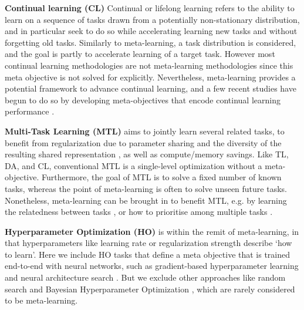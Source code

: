 \documentclass[10pt,journal,compsoc]{IEEEtran}
\newcommand{\keypoint}[1]{\vspace{0.1cm}\noindent\textbf{#1}\quad}
\begin{document}
\keypoint{Continual learning (CL)} Continual or lifelong learning \cite{ring1994continuallearningreinforcement, parisi2019continualsurvey,chen2018lifelong} refers to the ability to learn on a sequence of tasks drawn from a potentially non-stationary distribution, and in particular seek to do so while accelerating learning new tasks and without forgetting old tasks. Similarly to meta-learning, a task distribution is considered, and the goal is partly to accelerate learning of a target task. However most continual learning methodologies are not meta-learning methodologies since this meta objective is not solved for explicitly. Nevertheless, meta-learning provides a potential framework to advance continual learning, and a few recent studies have begun to do so by developing meta-objectives that encode continual learning performance \cite{alshedivat2018nonstationarymeta,ritter2018episodicmeta,clavera2019learning}.


\keypoint{Multi-Task Learning (MTL)} aims to jointly learn several related tasks, to benefit from regularization due to parameter sharing and the diversity of the resulting shared representation \cite{rich1997multitask,yang2017deepmtrl,meyerson2019modular}, as well as compute/memory savings. Like TL, DA, and CL, conventional MTL is a single-level optimization without a meta-objective. Furthermore, the goal of MTL is to solve a fixed number of known tasks, whereas the point of meta-learning is often to solve unseen future tasks. Nonetheless, meta-learning can be brought in to benefit MTL, e.g. by learning the relatedness between tasks \cite{franceschi2017hyperopt}, or how to prioritise among multiple tasks \cite{xingyu2019auxtask}.

\keypoint{Hyperparameter Optimization (HO)} is within the remit of meta-learning, in that hyperparameters like learning rate or regularization strength describe `how to learn'. Here we include HO tasks that define a meta objective that is trained end-to-end with neural networks, such as gradient-based hyperparameter learning \cite{franceschi2017hyperopt, micaelli2020nongreedy} and neural architecture search \cite{liu2019darts}. But we exclude other approaches like random search \cite{bergstra2012randomsearchhyper} and Bayesian Hyperparameter Optimization \cite{shahriari2016bayesianoptimizationsurvey}, which are rarely considered to be meta-learning.
\end{document}
